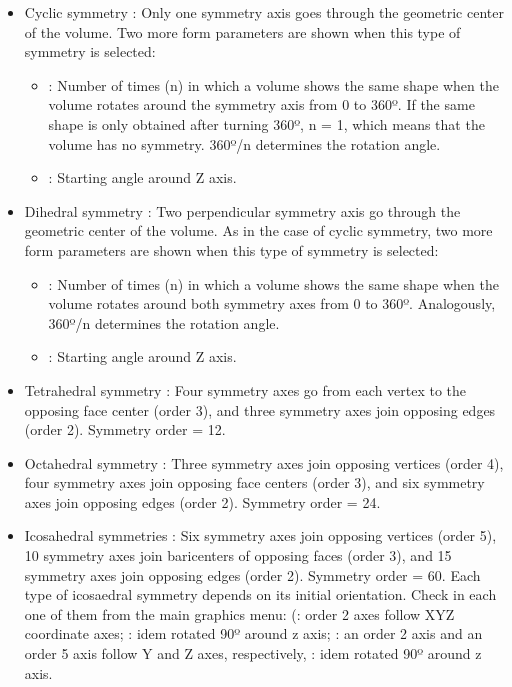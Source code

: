 \begin{itemize}
\begin{itemize}
  \begin{itemize}
  \item Cyclic symmetry : Only one symmetry axis goes through the geometric center of the volume. Two more form parameters are shown when this type of symmetry is selected:\\
   \begin{itemize}
    \item {}: Number of times (n) in which a volume shows the same shape when the volume rotates around the symmetry axis from 0 to 360º. If the same shape is only obtained after turning 360º, n = 1, which means that the volume has no symmetry. 360º/n determines the rotation angle. \\ 
	\item {}: Starting angle around Z axis.\\ 
   \end{itemize}
  \item Dihedral symmetry : Two perpendicular symmetry axis go through the geometric center of the volume. As in the case of cyclic symmetry, two more form parameters are shown when this type of symmetry is selected:\\
   \begin{itemize}
    \item {}: Number of times (n) in which a volume shows the same shape when the volume rotates around both symmetry axes from 0 to 360º. Analogously, 360º/n determines the rotation angle.\\ 
	\item {}: Starting angle around Z axis.\\ 
   \end{itemize}
  \item Tetrahedral symmetry : Four symmetry axes go from each vertex to the opposing face center (order 3), and three symmetry axes join opposing edges (order 2). Symmetry order = 12.\\
  \item Octahedral symmetry : Three symmetry axes join opposing vertices (order 4), four symmetry axes join opposing face centers (order 3), and six symmetry axes join opposing edges (order 2). Symmetry order = 24.\\
  \item Icosahedral symmetries : Six symmetry axes join opposing vertices (order 5), 10 symmetry axes join baricenters of opposing faces (order 3), and 15 symmetry axes join opposing edges (order 2). Symmetry order = 60. Each type of icosaedral symmetry depends on its initial orientation. Check in \chimera each one of them from the main graphics menu:  (: order 2 axes follow XYZ coordinate axes; : idem rotated 90º around z axis; : an order 2 axis and an order 5 axis follow Y and Z axes, respectively, : idem rotated 90º around z axis.\\
  \end{itemize}
  

\end{itemize}
\end{itemize}
